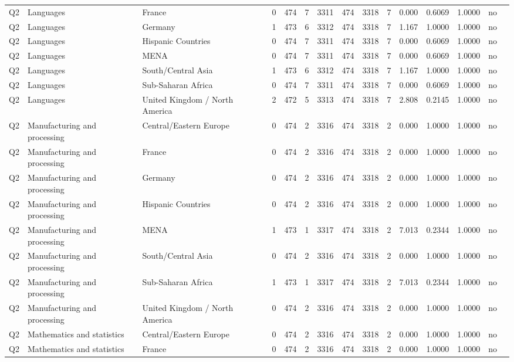 \begin{longtable}{lllrcccccccccll}
Q2 & Languages & France & 0 & 474 & 7 & 3311 & 474 & 3318 & 7 & 0.000 & 0.6069 & 1.0000 & no \\
Q2 & Languages & Germany & 1 & 473 & 6 & 3312 & 474 & 3318 & 7 & 1.167 & 1.0000 & 1.0000 & no \\
Q2 & Languages & Hispanic Countries & 0 & 474 & 7 & 3311 & 474 & 3318 & 7 & 0.000 & 0.6069 & 1.0000 & no \\
Q2 & Languages & MENA & 0 & 474 & 7 & 3311 & 474 & 3318 & 7 & 0.000 & 0.6069 & 1.0000 & no \\
Q2 & Languages & South/Central Asia & 1 & 473 & 6 & 3312 & 474 & 3318 & 7 & 1.167 & 1.0000 & 1.0000 & no \\
Q2 & Languages & Sub-Saharan Africa & 0 & 474 & 7 & 3311 & 474 & 3318 & 7 & 0.000 & 0.6069 & 1.0000 & no \\
Q2 & Languages & United Kingdom / North America & 2 & 472 & 5 & 3313 & 474 & 3318 & 7 & 2.808 & 0.2145 & 1.0000 & no \\
Q2 & Manufacturing and processing & Central/Eastern Europe & 0 & 474 & 2 & 3316 & 474 & 3318 & 2 & 0.000 & 1.0000 & 1.0000 & no \\
Q2 & Manufacturing and processing & France & 0 & 474 & 2 & 3316 & 474 & 3318 & 2 & 0.000 & 1.0000 & 1.0000 & no \\
Q2 & Manufacturing and processing & Germany & 0 & 474 & 2 & 3316 & 474 & 3318 & 2 & 0.000 & 1.0000 & 1.0000 & no \\
Q2 & Manufacturing and processing & Hispanic Countries & 0 & 474 & 2 & 3316 & 474 & 3318 & 2 & 0.000 & 1.0000 & 1.0000 & no \\
Q2 & Manufacturing and processing & MENA & 1 & 473 & 1 & 3317 & 474 & 3318 & 2 & 7.013 & 0.2344 & 1.0000 & no \\
Q2 & Manufacturing and processing & South/Central Asia & 0 & 474 & 2 & 3316 & 474 & 3318 & 2 & 0.000 & 1.0000 & 1.0000 & no \\
Q2 & Manufacturing and processing & Sub-Saharan Africa & 1 & 473 & 1 & 3317 & 474 & 3318 & 2 & 7.013 & 0.2344 & 1.0000 & no \\
Q2 & Manufacturing and processing & United Kingdom / North America & 0 & 474 & 2 & 3316 & 474 & 3318 & 2 & 0.000 & 1.0000 & 1.0000 & no \\
Q2 & Mathematics and statistics & Central/Eastern Europe & 0 & 474 & 2 & 3316 & 474 & 3318 & 2 & 0.000 & 1.0000 & 1.0000 & no \\
Q2 & Mathematics and statistics & France & 0 & 474 & 2 & 3316 & 474 & 3318 & 2 & 0.000 & 1.0000 & 1.0000 & no \\

\end{longtable}
